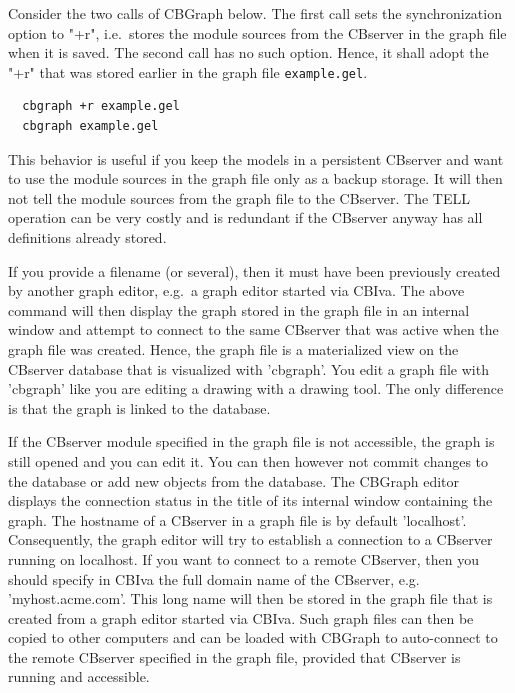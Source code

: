Consider the two calls of CBGraph below. The first call sets the synchronization option to "+r", i.e.\
stores the module sources from the CBserver in the graph file when it is saved. 
The second call has no such option. Hence, it shall adopt the "+r" that was stored earlier in the graph file
{\tt example.gel}.

{\small
\begin{verbatim}
  cbgraph +r example.gel
  cbgraph example.gel
\end{verbatim}
}

This behavior is useful if you keep the models in a persistent CBserver and want to use the module sources in
the graph file only as a backup storage. It will then not tell the module sources from the graph file to the CBserver.
The TELL operation can be very costly and is redundant if the CBserver anyway has all definitions already stored.



If you provide a filename (or several), then it must have been previously created
by another graph editor, e.g.\ a graph editor started via CBIva.
The above command will then display the graph stored 
in the graph file in an internal window and attempt to connect to the same
CBserver that was active when the graph file
was created. Hence, the graph file is a materialized view on the CBserver database that is 
visualized with 'cbgraph'. You edit a graph file with 'cbgraph' like you are editing a drawing
with a drawing tool. The only difference is that the graph is linked to the database.

If the CBserver module specified in the graph file is not accessible, the graph is still opened
and you can edit it. You can then however not commit changes to the database or add new
objects from the database. The CBGraph editor displays the connection status in the title
of its internal window containing the graph.
The hostname of a CBserver in a graph file is by default 'localhost'. Consequently, the graph
editor will try to establish a connection to a CBserver running on localhost. If you want to connect
to a remote CBserver, then you should specify in CBIva the full domain name of the CBserver,
e.g. 'myhost.acme.com'. This long name will then be stored in the graph file that is created
from a graph editor started via CBIva. Such graph files can then be copied to other computers
and can be loaded with CBGraph to auto-connect to the remote CBserver specified in the graph file,
provided that CBserver is running and accessible.

